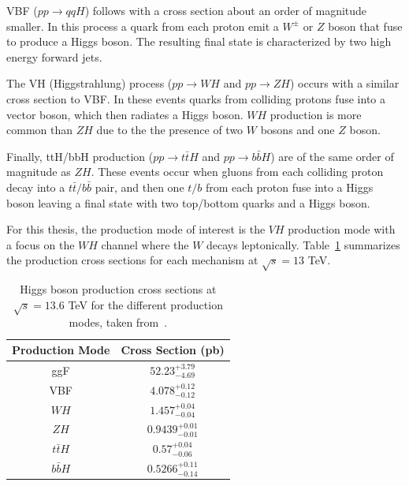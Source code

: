 VBF ($pp \rightarrow qqH$) follows with a cross section about an order of magnitude smaller. In this process a quark from each proton emit a $W^{\pm}$ or $Z$ boson that fuse to produce a Higgs boson. The resulting final state is characterized by two high energy forward jets. 

The VH (Higgstrahlung) process ($pp \rightarrow WH$ and $pp \rightarrow ZH$) occurs with a similar cross section to VBF\@. In these events quarks from colliding protons fuse into a vector boson, which then radiates a Higgs boson. $WH$ production is more common than $ZH$ due to the the presence of two $W$ bosons and one $Z$ boson. 

Finally, ttH/bbH production ($pp \rightarrow t\bar{t}H$ and $pp \rightarrow b\bar{b}H$) are of the same order of magnitude as $ZH$. These events occur when gluons from each colliding proton decay into a $t\bar{t} \slash b\bar{b}$ pair, and then one $t \slash b$ from each proton fuse into a Higgs boson leaving a final state with two top/bottom quarks and a Higgs boson. 

For this thesis, the production mode of interest is the $VH$ production mode with a focus on the $WH$ channel where the $W$ decays leptonically. Table~\ref{tab:higgs_production_cross_sections} summarizes the production cross sections for each mechanism at $\sqrt{s} = 13$ TeV.

\begin{table}
  \centering
  \begin{tabular}{c|c}
    \hline
    Production Mode & Cross Section (pb) \\
    \hline
    ggF & $52.23^{+3.79}_{-4.69}$ \\
    VBF & $4.078^{+0.12}_{-0.12}$ \\
    $WH$ & $1.457^{+0.04}_{-0.04}$ \\
    $ZH$ & $0.9439^{+0.01}_{-0.01}$ \\
    $t\bar{t}H$ & $0.57^{+0.04}_{-0.06}$ \\
    $b\bar{b}H$ & $0.5266^{+0.11}_{-0.14}$ \\
    \hline
  \end{tabular}
  \caption{Higgs boson production cross sections at $\sqrt{s} = 13.6$ TeV for the different production modes, taken from~\cite{Higgs_production_cross_sections}.}\label{tab:higgs_production_cross_sections}
\end{table}